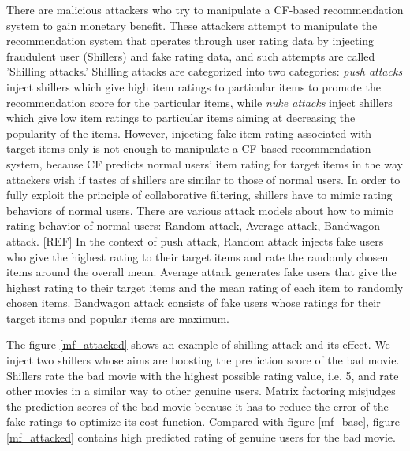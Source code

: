 \documentclass[master,english,final]{kaist-ucs}
\begin{document}
There are malicious attackers who try to manipulate a CF-based recommendation system to gain monetary benefit.
These attackers attempt to manipulate the recommendation system that operates through user rating data by injecting fraudulent user (Shillers) and fake rating data, and such attempts are called 'Shilling attacks.'
Shilling attacks are categorized into two categories: \textit{push attacks} inject shillers which give high item ratings to particular items to promote the recommendation score for the particular items, while \textit{nuke attacks} inject shillers which give low item ratings to particular items aiming at decreasing the popularity of the items.
However, injecting fake item rating associated with target items only is not enough to manipulate a CF-based recommendation system, because CF predicts normal users' item rating for target items in the way attackers wish if tastes of shillers are similar to those of normal users.
In order to fully exploit the principle of collaborative filtering, shillers have to mimic rating behaviors of normal users.
There are various attack models about how to mimic rating behavior of normal users: Random attack, Average attack, Bandwagon attack. [REF]
In the context of push attack, Random attack injects fake users who give the highest rating to their target items and rate the randomly chosen items around the overall mean.
Average attack generates fake users that give the highest rating to their target items and the mean rating of each item to randomly chosen items.
Bandwagon attack consists of fake users whose ratings for their target items and popular items are maximum.

The figure \ref{mf_attacked} shows an example of shilling attack and its effect. We inject two shillers whose aims are boosting the prediction score of the bad movie.
Shillers rate the bad movie with the highest possible rating value, i.e. 5, and rate other movies in a similar way to other genuine users.
Matrix factoring misjudges the prediction scores of the bad movie because it has to reduce the error of the fake ratings to optimize its cost function.
Compared with figure \ref{mf_base}, figure \ref{mf_attacked} contains high predicted rating of genuine users for the bad movie.
\end{document}
